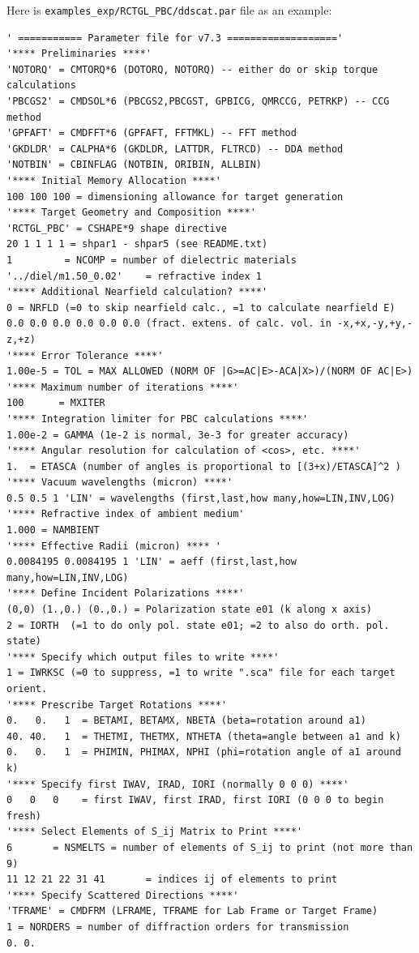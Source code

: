 Here is {\tt examples\_exp/RCTGL\_PBC/ddscat.par} file as an example:
{\scriptsize
\begin{verbatim}
' =========== Parameter file for v7.3 ===================' 
'**** Preliminaries ****'
'NOTORQ' = CMTORQ*6 (DOTORQ, NOTORQ) -- either do or skip torque calculations
'PBCGS2' = CMDSOL*6 (PBCGS2,PBCGST, GPBICG, QMRCCG, PETRKP) -- CCG method
'GPFAFT' = CMDFFT*6 (GPFAFT, FFTMKL) -- FFT method
'GKDLDR' = CALPHA*6 (GKDLDR, LATTDR, FLTRCD) -- DDA method
'NOTBIN' = CBINFLAG (NOTBIN, ORIBIN, ALLBIN)
'**** Initial Memory Allocation ****'
100 100 100 = dimensioning allowance for target generation
'**** Target Geometry and Composition ****'
'RCTGL_PBC' = CSHAPE*9 shape directive
20 1 1 1 1 = shpar1 - shpar5 (see README.txt)
1         = NCOMP = number of dielectric materials
'../diel/m1.50_0.02'    = refractive index 1
'**** Additional Nearfield calculation? ****'
0 = NRFLD (=0 to skip nearfield calc., =1 to calculate nearfield E)
0.0 0.0 0.0 0.0 0.0 0.0 (fract. extens. of calc. vol. in -x,+x,-y,+y,-z,+z)
'**** Error Tolerance ****'
1.00e-5 = TOL = MAX ALLOWED (NORM OF |G>=AC|E>-ACA|X>)/(NORM OF AC|E>)
'**** Maximum number of iterations ****'
100      = MXITER
'**** Integration limiter for PBC calculations ****'
1.00e-2 = GAMMA (1e-2 is normal, 3e-3 for greater accuracy)
'**** Angular resolution for calculation of <cos>, etc. ****'
1.	= ETASCA (number of angles is proportional to [(3+x)/ETASCA]^2 )
'**** Vacuum wavelengths (micron) ****'
0.5 0.5 1 'LIN' = wavelengths (first,last,how many,how=LIN,INV,LOG)
'**** Refractive index of ambient medium'
1.000 = NAMBIENT
'**** Effective Radii (micron) **** '
0.0084195 0.0084195 1 'LIN' = aeff (first,last,how many,how=LIN,INV,LOG)
'**** Define Incident Polarizations ****'
(0,0) (1.,0.) (0.,0.) = Polarization state e01 (k along x axis)
2 = IORTH  (=1 to do only pol. state e01; =2 to also do orth. pol. state)
'**** Specify which output files to write ****'
1 = IWRKSC (=0 to suppress, =1 to write ".sca" file for each target orient.
'**** Prescribe Target Rotations ****'
0.   0.   1  = BETAMI, BETAMX, NBETA (beta=rotation around a1)
40. 40.   1  = THETMI, THETMX, NTHETA (theta=angle between a1 and k)
0.   0.   1  = PHIMIN, PHIMAX, NPHI (phi=rotation angle of a1 around k)
'**** Specify first IWAV, IRAD, IORI (normally 0 0 0) ****'
0   0   0    = first IWAV, first IRAD, first IORI (0 0 0 to begin fresh)
'**** Select Elements of S_ij Matrix to Print ****'
6       = NSMELTS = number of elements of S_ij to print (not more than 9)
11 12 21 22 31 41       = indices ij of elements to print
'**** Specify Scattered Directions ****'
'TFRAME' = CMDFRM (LFRAME, TFRAME for Lab Frame or Target Frame)
1 = NORDERS = number of diffraction orders for transmission
0. 0.
\end{verbatim}}

